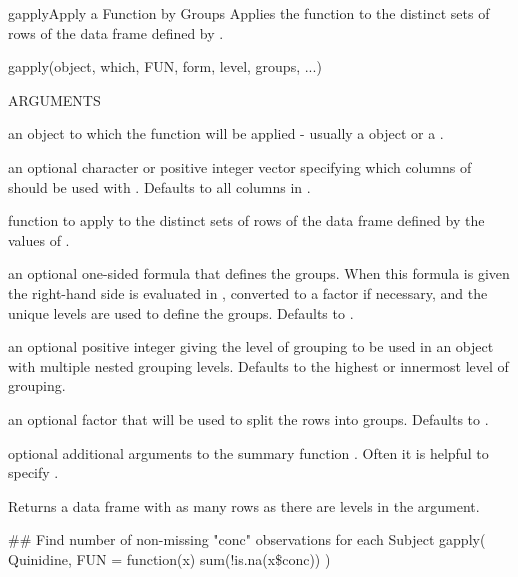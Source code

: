 \documentclass[pdftex]{article} \usepackage{url,graphicx}
\begin{document}
\begin{Helpfile}{gapply}{Apply a Function by Groups}
Applies the function to the distinct sets of rows of the data frame
defined by .
\begin{Example}
gapply(object, which, FUN, form, level, groups, ...)
\end{Example}
\begin{Argument}{ARGUMENTS}
\item[\Co{object:}]
an object to which the function will be applied - usually
a  object or a .
\item[\Co{which:}]
an optional character or positive integer vector specifying which
columns of  should be used with . Defaults to all columns
in . 
\item[\Co{FUN:}]
function to apply to the distinct sets of rows
of the data frame  defined by the values of
.
\item[\Co{form:}]
an optional one-sided formula that defines the groups.
When this formula is given the right-hand side is evaluated in
, converted to a factor if necessary, and the unique
levels are used to define the groups.  Defaults to
.
\item[\Co{level:}]
an optional positive integer giving the level of grouping
to be used in an object with multiple nested grouping levels.
Defaults to the highest or innermost level of grouping.
\item[\Co{groups:}]
an optional factor that will be used to split the 
rows into groups.  Defaults to .
\item[\Co{...:}]
optional additional arguments to the summary function
.  Often it is helpful to specify .
\end{Argument}
Returns a data frame with as many rows as there are levels in the
 argument.
\need 15pt
\vspace{-16pt} 
\begin{Example}
## Find number of non-missing "conc" observations for each Subject
gapply( Quinidine, FUN = function(x) sum(!is.na(x\$conc)) )
\end{Example}
\end{Helpfile}
\end{document}
